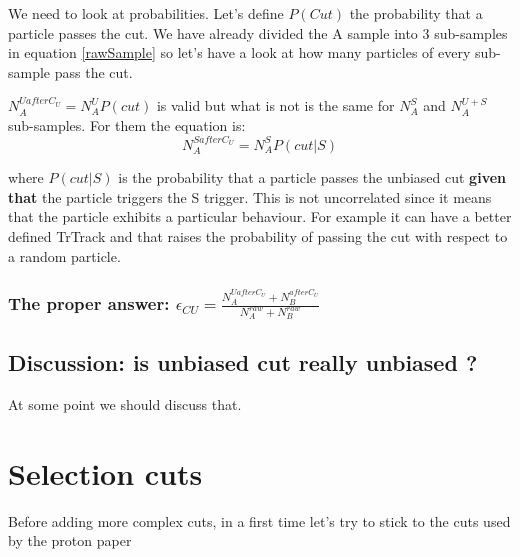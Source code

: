 \documentclass[fleqn,twoside]{article}
\begin{document}
We need to look at probabilities. Let's define $P(Cut)$ the probability that a particle passes the cut.
We have already divided the A sample into 3 sub-samples in equation \ref{rawSample} so let's have a look at how many particles of every sub-sample pass the cut.

$N_{A}^{U after C_{U}} = N_{A}^{U} P(cut)$ is valid but what is not is the same for $N_{A}^{S}$ and $N_{A}^{U+S}$ sub-samples.
For them the equation is:
\begin{equation}
  N_{A}^{S after C_{U}} = N_{A}^{S} P(cut|S)
\end{equation}

where $P(cut|S)$ is the probability that a particle passes the unbiased cut \textbf{given that} the particle triggers the S trigger. This is not uncorrelated since it means that the particle exhibits a particular behaviour. For example it can have a better defined TrTrack and that raises the probability of passing the cut with respect to a random particle.

\subsubsection{The proper answer: $\epsilon_{CU} = \frac{N_{A}^{U after C_{U}} + N_{B}^{after C_{U}}}{N_{A}^{raw} + N_{B}^{raw}}$}

\subsection{Discussion: is unbiased cut really unbiased ?}
At some point we should discuss that.

\section{Selection cuts}
Before adding more complex cuts, in a first time let's try to stick to the cuts used by the proton paper
\end{document}

